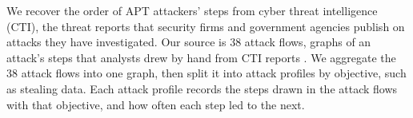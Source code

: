 \documentclass{cshonours}
\begin{document}
We recover the order of APT attackers' steps from cyber threat intelligence
(CTI), the threat reports that security firms and government agencies
publish on attacks they have investigated. Our source is 38 attack flows,
graphs of an attack's steps that analysts drew by hand from CTI reports
\citep{ctid2025attackflow}. We aggregate the 38 attack flows into one
graph, then split it into attack profiles by objective, such
as stealing data. Each attack profile records the steps drawn in
the attack flows with that objective, and how often each step led to the next.
\end{document}

